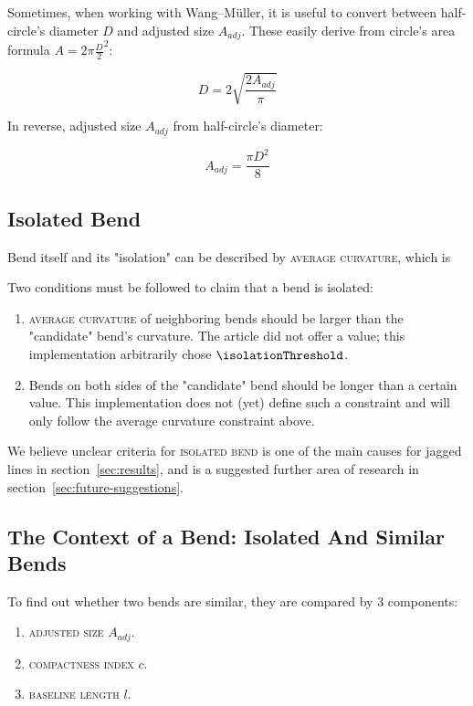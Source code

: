 \documentclass[a4paper]{article}
\newcommand{\WM}{Wang--M{\"u}ller}
\begin{document}
Sometimes, when working with {\WM}, it is useful to convert between
half-circle's diameter $D$ and adjusted size $A_{adj}$. These easily derive
from circle's area formula $A = 2\pi \frac{D}{2}^2$:

\[
  D = 2\sqrt{\frac{2 A_{adj}}{\pi}}
\]

In reverse, adjusted size $A_{adj}$ from half-circle's diameter:

\[
  A_{adj} = \frac{\pi D^2}{8}
\]

\subsection{Isolated Bend}
\label{sec:isolated-bend}

Bend itself and its "isolation" can be described by \textsc{average curvature},
which is 

Two conditions must be followed to claim that a bend is isolated:

\begin{enumerate}
    \item \textsc{average curvature} of neighboring bends should be larger
        than the "candidate" bend's curvature. The article did not offer a
        value; this implementation arbitrarily chose $\isolationThreshold$.

    \item Bends on both sides of the "candidate" bend should be longer than a
        certain value. This implementation does not (yet) define such a
        constraint and will only follow the average curvature constraint above.

\end{enumerate}

We believe unclear criteria for \textsc{isolated bend} is one of the main
causes for jagged lines in section~\ref{sec:results}, and is a suggested
further area of research in section~\ref{sec:future-suggestions}.

\subsection{The Context of a Bend: Isolated And Similar Bends}

To find out whether two bends are similar, they are compared by 3 components:

\begin{enumerate}
  \item \textsc{adjusted size} $A_{adj}$.
  \item \textsc{compactness index} $c$.
  \item \textsc{baseline length} $l$.
\end{enumerate}
\end{document}

